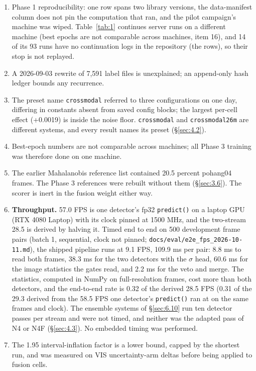 \documentclass[10pt]{article}
\begin{document}
\begin{enumerate}
\item Phase 1 reproducibility: one row spans two library versions, the data-manifest column does not pin the computation that ran, and the pilot campaign's machine was wiped. Table~\ref{tab:1} continues server runs on a different machine (best epochs are not comparable across machines, item 16), and 14 of its 93 runs have no continuation logs in the repository (the \textdagger{} rows), so their stop is not replayed.
\item A 2026-09-03 rewrite of 7,591 label files is unexplained; an append-only hash ledger bounds any recurrence.
\item The preset name \texttt{crossmodal} referred to three configurations on one day, differing in constants absent from saved config blocks; the largest per-cell effect (+0.0019) is inside the noise floor. \texttt{crossmodal} and \texttt{crossmodal26m} are different systems, and every result names its preset (\S\ref{sec:4.2}).
\item Best-epoch numbers are not comparable across machines; all Phase 3 training was therefore done on one machine.
\item The earlier Mahalanobis reference list contained 20.5 percent pohang04 frames. The Phase 3 references were rebuilt without them (\S\ref{sec:3.6}). The scorer is inert in the fusion weight either way.
\item \textbf{Throughput.} 57.0 FPS is one detector's fp32 \texttt{predict()} on a laptop GPU (RTX 4080 Laptop) with its clock pinned at 1500 MHz, and the two-stream 28.5 is derived by halving it. Timed end to end on 500 development frame pairs (batch 1, sequential, clock not pinned; \texttt{docs/\allowbreak{}eval/\allowbreak{}e2e\_\allowbreak{}fps\_\allowbreak{}2026-10-11.md}), the shipped pipeline runs at 9.1 FPS, 109.9 ms per pair: 8.8 ms to read both frames, 38.3 ms for the two detectors with the $\sigma$ head, 60.6 ms for the image statistics the gates read, and 2.2 ms for the veto and merge. The statistics, computed in NumPy on full-resolution frames, cost more than both detectors, and the end-to-end rate is 0.32 of the derived 28.5 FPS (0.31 of the 29.3 derived from the 58.5 FPS one detector's \texttt{predict()} ran at on the same frames and clock). The ensemble systems of \S\ref{sec:6.10} run ten detector passes per stream and were not timed, and neither was the adapted pass of N4 or N4F (\S\ref{sec:4.3}). No embedded timing was performed.
\item The 1.95 interval-inflation factor is a lower bound, capped by the shortest run, and was measured on VIS uncertainty-arm deltas before being applied to fusion cells.

\end{enumerate}
\end{document}

